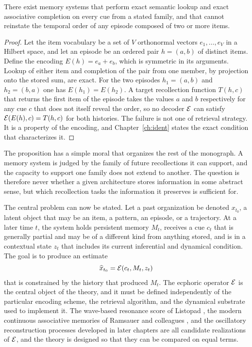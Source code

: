 \begin{proposition}\label{prop:nonimpl}
There exist memory systems that perform exact semantic lookup and exact associative completion on every cue from a stated family, and that cannot reinstate the temporal order of any episode composed of two or more items.
\end{proposition}

\begin{proof}
Let the item vocabulary be a set of $V$ orthonormal vectors $e_1,\dots,e_V$ in a Hilbert space, and let an episode be an ordered pair $h=(a,b)$ of distinct items. Define the encoding $E(h)=e_a+e_b$, which is symmetric in its arguments. Lookup of either item and completion of the pair from one member, by projection onto the stored sum, are exact. For the two episodes $h_1=(a,b)$ and $h_2=(b,a)$ one has $E(h_1)=E(h_2)$. A target recollection function $T(h,c)$ that returns the first item of the episode takes the values $a$ and $b$ respectively for any cue $c$ that does not itself reveal the order, so no decoder $\mathcal{E}$ can satisfy $\mathcal{E}(E(h),c)=T(h,c)$ for both histories. The failure is not one of retrieval strategy. It is a property of the encoding, and Chapter~\ref{ch:ident} states the exact condition that characterizes it.
\end{proof}

The proposition has a simple moral that organizes the rest of the monograph. A memory system is judged by the family of future recollections it can support, and the capacity to support one family does not extend to another. The question is therefore never whether a given architecture stores information in some abstract sense, but which recollection tasks the information it preserves is sufficient for.

The central problem can now be stated. Let a past organization be denoted $x_{t_0}$, a latent object that may be an item, a pattern, an episode, or a trajectory. At a later time $t$, the system holds persistent memory $M_t$, receives a cue $c_t$ that is generally partial and may be of a different kind from anything stored, and is in a contextual state $z_t$ that includes its current inferential and dynamical condition. The goal is to produce an estimate
\begin{equation}\label{eq:ecphory-intro}
\widehat{x}_{t_0}=\mathcal{E}(c_t,M_t,z_t)
\end{equation}
that is constrained by the history that produced $M_t$. The ecphoric operator $\mathcal{E}$ is the central object of the theory, and it must be defined independently of the particular encoding scheme, the retrieval algorithm, and the dynamical substrate used to implement it. The wave-based resonance score of Listopad \cite{listopad2025}, the modern continuous associative memories of Ramsauer and colleagues \cite{ramsauer2021}, and the oscillatory reconstruction processes developed in later chapters are all candidate realizations of $\mathcal{E}$, and the theory is designed so that they can be compared on equal terms.

